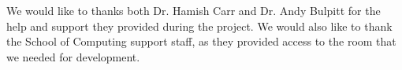 We would like to thanks both Dr. Hamish Carr and Dr. Andy Bulpitt for the help and support they provided during the project.
\newline
We would also like to thank the School of Computing support staff, as they provided access to the room that we needed for development.